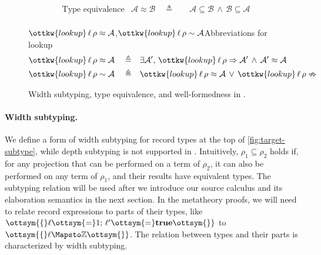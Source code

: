 \begin{figure}[t!]
  \small

  \begin{align*}
    &\text{Type equivalence} &\mathcal{A}  \approx  \mathcal{B} \quad\triangleq\quad&  \mathcal{A}  \subseteq  \mathcal{B}  \,\land\,  \mathcal{B}  \subseteq  \mathcal{A}  \\
  \end{align*}

  \ottdefnsRTSubtyping

  \begin{rulesection*}{$\ottkw{lookup} \, \ell \, \rho  \approx  \mathcal{A}$,$\ottkw{lookup} \, \ell \, \rho  \sim  \mathcal{A}$}{Abbreviations for lookup}
  \begin{align*}
    \ottkw{lookup} \, \ell \, \rho  \approx  \mathcal{A} \quad\triangleq\quad& \exists \mathcal{A}',\, \ottkw{lookup} \, \ell \, \rho  \Rightarrow  \mathcal{A}' \,\land\, \mathcal{A}'  \approx  \mathcal{A} \\
    \ottkw{lookup} \, \ell \, \rho  \sim  \mathcal{A}  \quad\triangleq\quad& \ottkw{lookup} \, \ell \, \rho  \approx  \mathcal{A} \,\lor\, \ottkw{lookup} \, \ell \, \rho  \nRightarrow \\
  \end{align*}
  \end{rulesection*}
  \ottdefnsWellformedCtx
  \ottdefnsWellformedTypes

  \caption{Width subtyping, type equivalence, and well-formedness in \lambdar.}
  \label{fig:target-subtype}
\end{figure}

\paragraph{Width subtyping.}
We define a form of width subtyping for record types at the top of
\autoref{fig:target-subtype}, while depth subtyping is not supported in
\lambdar. Intuitively, $ \rho_{{\mathrm{1}}}  \subseteq  \rho_{{\mathrm{2}}} $ holds if, for any projection that can
be performed on a term of $\rho_{{\mathrm{2}}}$, it can also be performed on any term of
$\rho_{{\mathrm{1}}}$, and their results have equivalent types. The subtyping relation will
be used after we introduce our source calculus and its elaboration semantics in
the next section. In the metatheory proofs, we will need to relate record
expressions to parts of their types, like $\ottsym{\{}  \ell  \ottsym{=}  1  ; \,  \ell'  \ottsym{=}   \mathbf{true}   \ottsym{\}}$ to
$\ottsym{\{}  \ell  \Mapsto   \mathbb{Z}   \ottsym{\}}$. The relation between types and their parts is characterized
by width subtyping.

